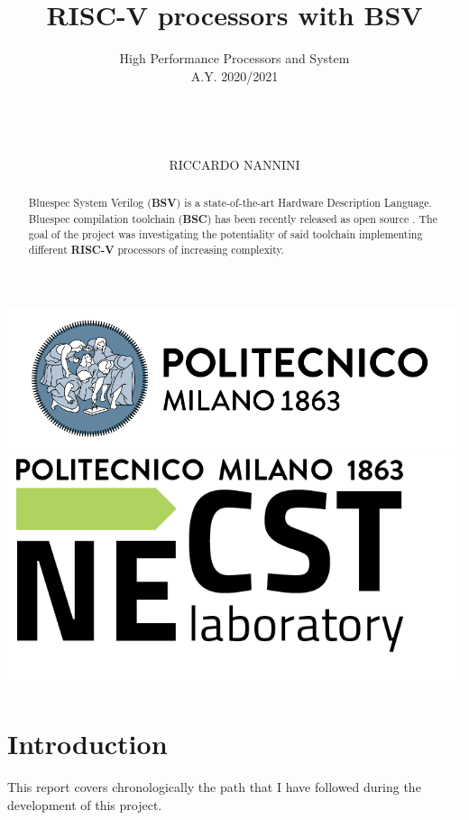 \documentclass[12pt,oneside,a4paper]{article}
\title{\textbf{RISC-V processors with BSV}}
\author{High Performance Processors and System\\ A.Y. 2020/2021\\\\\\\\\\\Large R\normalsize ICCARDO \Large N\normalsize ANNINI\\}
\date{\parbox{\linewidth}{\centering%
		\today\endgraf\bigskip\bigskip\bigskip\bigskip\bigskip\bigskip\bigskip
		\large T\normalsize UTORS\endgraf\medskip \normalsize E\footnotesize MANUELE \normalsize D\footnotesize EL \normalsize S\footnotesize OZZO \endgraf\smallskip
		\normalsize D\footnotesize AVIDE \normalsize C\footnotesize ONFICCONI \endgraf\bigskip\bigskip\bigskip
		\large P\normalsize ROFESSOR\endgraf\medskip \normalsize M\footnotesize ARCO \normalsize D\footnotesize OMENICO \normalsize S\footnotesize ANTAMBROGIO 
		}}
\begin{document}
\begin{titlepage}
	\centering
	\clearpage
	\maketitle
	\thispagestyle{empty}
	\vspace*{1cm}
	\vfill
	\centering
	\includegraphics{logo_polimi.png}\includegraphics{logo_NECST.png}
\end{titlepage}

\tableofcontents
\newpage

\begin{abstract}
Bluespec System Verilog (\textbf{BSV}) is a state-of-the-art Hardware Description Language.
Bluespec compilation toolchain (\textbf{BSC}) has been recently released as open source \cite{bsc}. The goal of the project was investigating the potentiality of said toolchain implementing different \textbf{RISC-V} processors of increasing complexity.\\
\end{abstract}

\section{Introduction} \label{sec:intro}

This report covers chronologically the path that I have followed during the development of this project.
 
\end{document}
